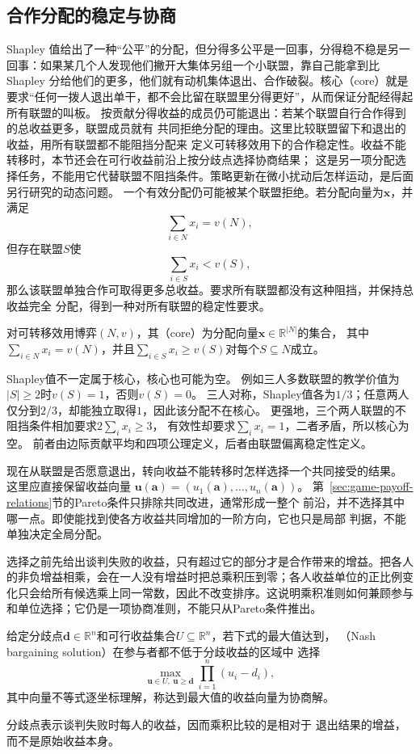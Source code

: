 \subsection{合作分配的稳定与协商}
\label{sec:game-cooperative-deviation}

Shapley 值给出了一种“公平”的分配，但分得多公平是一回事，分得稳不稳是另一回事：如果某几个人发现他们撇开大集体另组一个小联盟，靠自己能拿到比 Shapley 分给他们的更多，他们就有动机集体退出、合作破裂。核心（core）就是要求“任何一拨人退出单干，都不会比留在联盟里分得更好”，从而保证分配经得起所有联盟的叫板。
按贡献分得收益的成员仍可能退出：若某个联盟自行合作得到的总收益更多，联盟成员就有
共同拒绝分配的理由。这里比较联盟留下和退出的收益，用所有联盟都不能阻挡分配来
定义可转移效用下的合作稳定性。收益不能转移时，本节还会在可行收益前沿上按分歧点选择协商结果；
这是另一项分配选择任务，不能用它代替联盟不阻挡条件。策略更新在微小扰动后怎样运动，是后面另行研究的动态问题。
一个有效分配仍可能被某个联盟拒绝。若分配向量为\(\bm{x}\)，并满足
\[
  \sum_{i\in N}x_i=v(N),
\]
但存在联盟\(S\)使
\[
  \sum_{i\in S}x_i<v(S),
\]
那么该联盟单独合作可取得更多总收益。要求所有联盟都没有这种阻挡，并保持总收益完全
分配，得到一种对所有联盟的稳定性要求。
\begin{definition}[合作博弈的核心]
\label{def:game-cooperative-core}
对可转移效用博弈$(N,v)$，其（core）为分配向量$\bm x\in\mathbb R^{|N|}$的集合，
其中$\sum_{i\in N}x_i=v(N)$，并且$\sum_{i\in S}x_i\geq v(S)$对每个$S\subseteq N$成立。
\end{definition}
Shapley值不一定属于核心，核心也可能为空。
例如三人多数联盟的教学价值为$|S|\geq2$时$v(S)=1$，否则$v(S)=0$。
三人对称，Shapley值各为$1/3$；任意两人仅分到$2/3$，却能独立取得$1$，因此该分配不在核心。
更强地，三个两人联盟的不阻挡条件相加要求$2\sum_i x_i\geq3$，
有效性却要求$\sum_i x_i=1$，二者矛盾，所以核心为空。
前者由边际贡献平均和四项公理定义，后者由联盟偏离稳定性定义。

现在从联盟是否愿意退出，转向收益不能转移时怎样选择一个共同接受的结果。
这里应直接保留收益向量
\(\bm{u}(\bm{a})=(u_1(\bm{a}),\ldots,u_n(\bm{a}))\)。
第~\ref{sec:game-payoff-relations}节的Pareto条件只排除共同改进，通常形成一整个
前沿，并不选择其中哪一点。即使能找到使各方收益共同增加的一阶方向，它也只是局部
判据，不能单独决定全局分配。

选择之前先给出谈判失败的收益，只有超过它的部分才是合作带来的增益。把各人的非负增益相乘，会在一人没有增益时把总乘积压到零；各人收益单位的正比例变化只会给所有候选乘上同一常数，因此不改变排序。这说明乘积准则如何兼顾参与和单位选择；它仍是一项协商准则，不能只从Pareto条件推出。
\begin{definition}[Nash乘积协商解]
\label{def:game-nash-bargaining-solution}
给定分歧点\(\bm{d}\in\mathbb R^n\)和可行收益集合\(U\subseteq\mathbb{R}^n\)，若下式的最大值达到，
（Nash bargaining solution）在参与者都不低于分歧收益的区域中
选择
\begin{equation}
  \max_{\bm{u}\in U,\ \bm{u}\geq\bm{d}}
  \prod_{i=1}^{n}(u_i-d_i),
  \label{eq:game-nash-bargaining}
\end{equation}
其中向量不等式逐坐标理解，称达到最大值的收益向量为协商解。
\end{definition}
分歧点表示谈判失败时每人的收益，因而乘积比较的是相对于
退出结果的增益，而不是原始收益本身。

